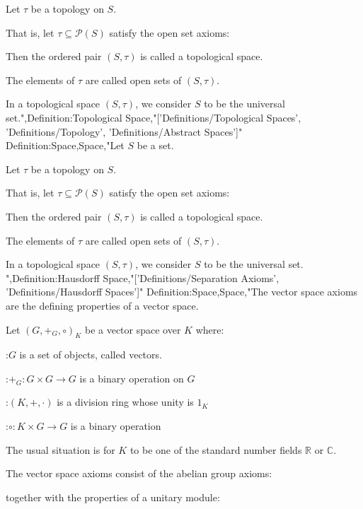 Let $\tau$ be a topology on $S$.

That is, let $\tau \subseteq \mathcal P \left( S \right)$ satisfy the open set axioms:


Then the ordered pair $\left( S, \tau \right)$ is called a topological space.

The elements of $\tau$ are called open sets of $\left( S, \tau \right)$.


In a topological space $\left( S, \tau \right)$, we consider $S$ to be the universal set.",Definition:Topological Space,"['Definitions/Topological Spaces', 'Definitions/Topology', 'Definitions/Abstract Spaces']"
Definition:Space,Space,"Let $S$ be a set.

Let $\tau$ be a topology on $S$.

That is, let $\tau \subseteq \mathcal P \left( S \right)$ satisfy the open set axioms:


Then the ordered pair $\left( S, \tau \right)$ is called a topological space.

The elements of $\tau$ are called open sets of $\left( S, \tau \right)$.


In a topological space $\left( S, \tau \right)$, we consider $S$ to be the universal set.
",Definition:Hausdorff Space,"['Definitions/Separation Axioms', 'Definitions/Hausdorff Spaces']"
Definition:Space,Space,"The vector space axioms are the defining properties of a vector space.

Let $\left( G, +_G, \circ \right)_K$ be a vector space over $K$ where:

:$G$ is a set of objects, called vectors.

:$+_G: G \times G \to G$ is a binary operation on $G$

:$\left( K, +, \cdot \right)$ is a division ring whose unity is $1_K$

:$\circ: K \times G \to G$ is a binary operation

The usual situation is for $K$ to be one of the standard number fields $\mathbb R$ or $\mathbb C$.


The vector space axioms consist of the abelian group axioms:










together with the properties of a unitary module:







